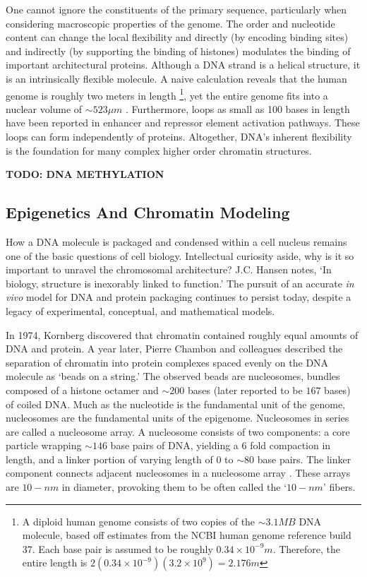 One cannot ignore the constituents of the primary sequence, particularly when
considering macroscopic properties of the genome.  The order and
nucleotide content can change the local flexibility and directly (by
encoding binding sites) and indirectly (by supporting the binding of histones)
modulates the binding of important architectural proteins\cite{travers2004}.
Although a DNA strand is a helical structure, it is an intrinsically
flexible molecule.  A naive calculation reveals that the human genome is
roughly two meters in length%
\footnote{%
  A diploid human genome consists of two copies of the $\sim3.1MB$ DNA molecule,
  based off estimates from the NCBI human genome reference build 37.
  Each base pair is assumed to be roughly $0.34\times10^{-9}m$.  Therefore, the
  entire length is $2(0.34 \times 10^{-9})(3.2 \times 10^9) = 2.176m$
},
yet the entire genome fits into a nuclear volume of $\sim523\mu{}m$
\cite{marks2011}.  Furthermore, loops as small as 100 bases in length have been
reported in enhancer and repressor element activation pathways\cite{wong2008}.
These loops can form independently of proteins\cite{vafabakhsh2012}.  Altogether, DNA's
inherent flexibility is the foundation for  many complex higher order
chromatin structures.

\textbf{TODO: DNA METHYLATION}

\subsection{Epigenetics And Chromatin Modeling}

How a DNA molecule is packaged and condensed within a cell nucleus remains
one of the basic questions of cell biology.  Intellectual curiosity aside,
why is it so important to unravel the chromosomal architecture?  J.C. Hansen
notes, `In biology, structure is inexorably linked to function.'\cite{hansen2012}
The pursuit of an accurate \textit{in vivo} model for DNA and protein packaging
continues to persist today, despite a legacy of experimental, conceptual, and
mathematical models.

In 1974, Kornberg discovered that chromatin contained roughly equal amounts of
DNA and protein\cite{kornberg1974}.  A year later, Pierre Chambon and colleagues
described the separation of chromatin into protein complexes spaced evenly on the DNA
molecule as `beads on a string.'\cite{oudet1975}  The observed beads are nucleosomes,
bundles composed of a histone octamer and $\sim200$ bases (later reported to be
$167$ bases\cite{robinson2006}) of coiled DNA\@.
Much as the nucleotide is the fundamental unit of the genome, nucleosomes are
the fundamental units of the epigenome.  Nucleosomes in series are called a
nucleosome array.  A nucleosome consists of two components: a core particle
wrapping $\sim146$ base pairs of DNA, yielding a 6 fold compaction in length,
and a linker portion of varying length of $0$ to $\sim80$ base pairs.  The
linker component connects adjacent nucleosomes in a nucleosome array\cite{wu2007}%
\cite{hansen2012}.  These arrays are $10-nm$ in diameter, provoking them to be
often called the `$10-nm$' fibers.

